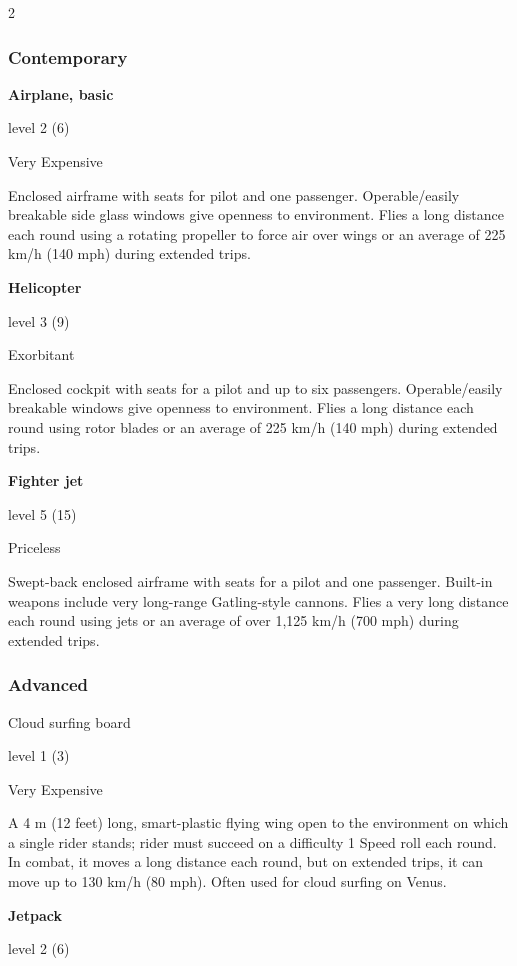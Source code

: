 \begin{multicols}{2}

\subsubsection{Contemporary}

\textbf{Airplane, basic}

level 2 (6) 

Very Expensive 

Enclosed airframe with seats for pilot and one passenger. Operable/easily breakable side glass windows give openness to environment. Flies a long distance each round using a rotating propeller to force air over wings or an average of 225 km/h (140 mph) during extended trips. 

\textbf{Helicopter} 

level 3 (9)

Exorbitant 

Enclosed cockpit with seats for a pilot and up to six passengers. Operable/easily breakable windows give openness to environment. Flies a long distance each round using rotor blades or an average of 225 km/h (140 mph) during extended trips. 

\textbf{Fighter jet}

level 5 (15) 

Priceless 

Swept-back enclosed airframe with seats for a pilot and one passenger. Built-in weapons include very long-range Gatling-style cannons. Flies a very long distance each round using jets or an average of over 1,125 km/h (700 mph) during extended trips.

\subsubsection{Advanced}

Cloud surfing board 

level 1 (3) 

Very Expensive 

A 4 m (12 feet) long, smart-plastic flying wing open to the environment on which a single rider stands; rider must succeed on a difficulty 1 Speed roll each round. In combat, it moves a long distance each round, but on extended trips, it can move up to 130 km/h (80 mph). Often used for cloud surfing on Venus. 

\textbf{Jetpack} 

level 2 (6) 


\end{multicols}
